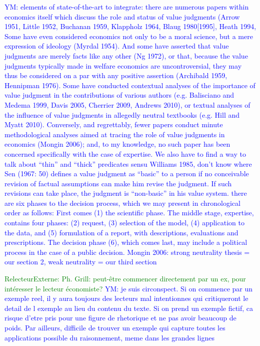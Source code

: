 \documentclass[preprint,11pt]{elsarticle}
\newcommand{\commentYM}[1]{\textcolor{blue}{YM: #1}}
\newcommand{\commentE}[1]{\textcolor{green}{RelecteurExterne: #1}}
\begin{document}
\commentYM{elements of state-of-the-art to integrate: there are numerous papers within economics itself
which discuss the role and status of value judgments (Arrow 1951, Little 1952,
Buchanan 1959, Klappholz 1964, Blaug 1980[1995], Heath 1994, Some have
even considered economics not only to be a moral science, but a mere expression
of ideology (Myrdal 1954). And some have asserted that value judgments
are merely facts like any other (Ng 1972), or that, because the value judgments
typically made in welfare economics are uncontroversial, they may thus be considered
on a par with any positive assertion (Archibald 1959, Hennipman 1976).
Some have conducted contextual analyses of the importance of value judgment
in the contributions of various authors (e.g. Balisciano and Medema 1999, Davis
2005, Cherrier 2009, Andrews 2010), or textual analyses of the influence of value
judgments in allegedly neutral textbooks (e.g. Hill and Myatt 2010). Conversely,
and regrettably, fewer papers conduct minute methodological analyses aimed at
tracing the role of value judgments in economics (Mongin 2006); and, to my
knowledge, no such paper has been concerned specifically with the case of expertise.
We also have to find a way to talk about ``thin'' and ``thick'' predicates sensu Williams 1985, don't know where
Sen (1967: 50) defines a value judgment
as “basic” to a person if no conceivable revision of factual assumptions can
make him revise the judgment. If such revisions can take place, the judgment is
“non-basic” in his value system.
there are six phases to the decision
process, which we may present in chronological order as follows: First comes
(1) the scientific phase. The middle stage, expertise, contains four phases: (2) request,
(3) selection of the model, (4) application to the data, and (5) formulation of
a report, with descriptions, evaluations and prescriptions. The decision phase (6),
which comes last, may include a political process in the case of a public decision.
Mongin 2006: strong neutrality thesis = our section 2, weak neutrality = our third section}

\commentE{Ph. Grill: peut-être commencer directement par un ex, pour intéresser le lecteur économiste?}
\commentYM{je suis circonspect. Si on commence par un exemple reel, il y aura toujours des lecteurs mal intentionnes qui critiqueront le detail de l exemple au lieu du contenu du texte. Si on prend un exemple fictif, ca risque d'etre pris pour une figure de rhetorique et ne pas avoir beaucoup de poids. Par ailleurs, difficile de trouver un exemple qui capture toutes les applications possible du raisonnement, meme dans les grandes lignes}
\end{document}
